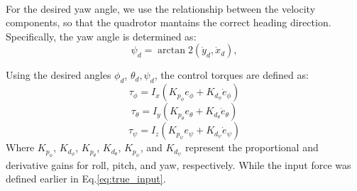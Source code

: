 \noindent\\
For the desired yaw angle, we use the relationship between the velocity 
components, so that the quadrotor mantains the correct heading direction.
Specifically, the yaw angle is determined as:
\begin{equation}
    \psi_d = \arctan2(\dot{y}_d, \dot{x}_d),
\end{equation}

\noindent
Using the desired angles $\phi_d$, $\theta_d, \psi_d$, the control torques are defined as:
\begin{equation}
    \label{eq:input_phi}
    \tau_\phi = I_x \left(  K_{p_\phi} e_\phi + K_{d_\phi} \dot{e}_\phi \right)
\end{equation}
\begin{equation}
    \label{eq:input_theta}
    \tau_\theta = I_y \left(K_{p_\theta} e_\theta + K_{d_\theta} \dot{e}_\theta \right)
\end{equation}
\begin{equation}
    \label{eq:input_psi}
    \tau_\psi = I_z \left(K_{p_\psi} e_\psi + K_{d_\psi} \dot{e}_\psi \right)
\end{equation}
Where $K_{p_\phi}$, $K_{d_\phi}$, $K_{p_\theta}$, $K_{d_\theta}$, $K_{p_\psi}$, and $K_{d_\psi}$ 
represent the proportional and derivative gains for roll, pitch, and yaw, respectively. 
While the input force was defined earlier in Eq.\ref{eq:true_input}.

